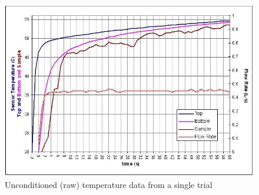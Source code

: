 \begin{figure}
\label{rawTemps}
\begin{center}
\includegraphics[scale=.4]{rawTemps.JPG}
\caption{Unconditioned (raw) temperature data from a single trial}
\end{center}
\end{figure}

